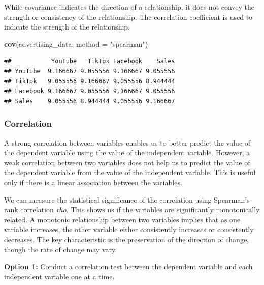 \documentclass[
]{article}
\newenvironment{Shaded}{\begin{snugshade}}{\end{snugshade}}
\newcommand{\AttributeTok}[1]{\textcolor[rgb]{0.13,0.29,0.53}{#1}}
\newcommand{\FunctionTok}[1]{\textcolor[rgb]{0.13,0.29,0.53}{\textbf{#1}}}
\newcommand{\NormalTok}[1]{#1}
\newcommand{\SpecialCharTok}[1]{\textcolor[rgb]{0.81,0.36,0.00}{\textbf{#1}}}
\newcommand{\StringTok}[1]{\textcolor[rgb]{0.31,0.60,0.02}{#1}}
\begin{document}
While covariance indicates the direction of a relationship, it does not
convey the strength or consistency of the relationship. The correlation
coefficient is used to indicate the strength of the relationship.

\begin{Shaded}
\begin{Highlighting}[]
\FunctionTok{cov}\NormalTok{(advertising\_data, }\AttributeTok{method =} \StringTok{"spearman"}\NormalTok{)}
\end{Highlighting}
\end{Shaded}

\begin{verbatim}
##           YouTube   TikTok Facebook    Sales
## YouTube  9.166667 9.055556 9.166667 9.055556
## TikTok   9.055556 9.166667 9.055556 8.944444
## Facebook 9.166667 9.055556 9.166667 9.055556
## Sales    9.055556 8.944444 9.055556 9.166667
\end{verbatim}

\subsubsection{\texorpdfstring{\textbf{Correlation}}{Correlation}}\label{correlation}

A strong correlation between variables enables us to better predict the
value of the dependent variable using the value of the independent
variable. However, a weak correlation between two variables does not
help us to predict the value of the dependent variable from the value of
the independent variable. This is useful only if there is a linear
association between the variables.

We can measure the statistical significance of the correlation using
Spearman's rank correlation \emph{rho}. This shows us if the variables
are significantly monotonically related. A monotonic relationship
between two variables implies that as one variable increases, the other
variable either consistently increases or consistently decreases. The
key characteristic is the preservation of the direction of change,
though the rate of change may vary.

\textbf{Option 1:} Conduct a correlation test between the dependent
variable and each independent variable one at a time.

\begin{Shaded}
\end{Shaded}
\end{document}
